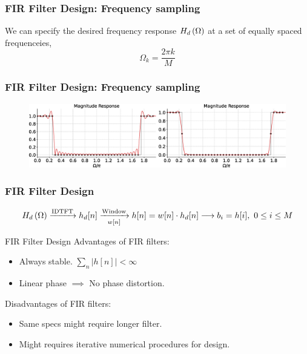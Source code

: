\documentclass[aspectratio=169]{beamer}
\let\olditem\item
\renewcommand{\item}{\setlength{\itemsep}{\fill}\olditem}
\def\lp{\ensuremath\left(}
\def\rp{\ensuremath\right)}
\begin{document}
\begin{frame}[t]
  \frametitle{FIR Filter Design: Frequency sampling}

  We can specify the desired frequency response $H_d\lp \Omega \rp$ at a set of equally spaced frequenceies,
  \[ \Omega_k = \frac{2\pi k}{M}\] 
  
\end{frame}


\begin{frame}[t]
  \frametitle{FIR Filter Design: Frequency sampling}

  \begin{figure}
  \centering
  \includegraphics[width=1\textwidth]{img/firfreqsamp.eps}
  \end{figure}

\end{frame}


\begin{frame}[t]
  \frametitle{FIR Filter Design}

  \[ H_d\lp \Omega \rp \xrightarrow[]{\text{IDTFT}} h_d[n] \xrightarrow[{w[n]}]{\text{Window}} h[n] = w[n] \cdot h_d[n] \longrightarrow b_i = h[i], \,\, 0 \leq i \leq M \]

\end{frame}


\begin{frame}{FIR Filter Design}
  Advantages of FIR filters:
  \begin{itemize}
    \item Always stable. $\sum_n \vert h[n] \vert < \infty$
    \item Linear phase $\implies$ No phase distortion.
  \end{itemize}
  \vspace{1cm}

  Disadvantages of FIR filters:
  \begin{itemize}
    \item Same specs might require longer filter.
    \item Might requires iterative numerical procedures for design.
  \end{itemize}
  \vspace{1cm}
\end{frame}
\end{document}
